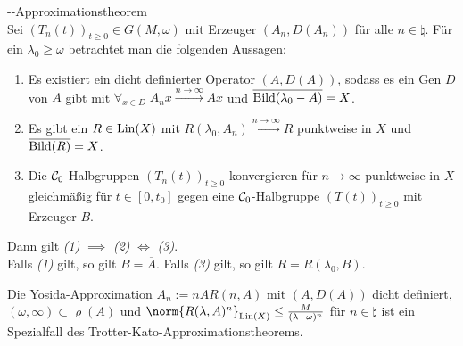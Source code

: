 \begin{Satz}{--Approximationstheorem}\\
    Sei $(T_n(t))_{t \ge 0} \in G(M, \omega)$ mit Erzeuger $(A_n, D(A_n))$ für alle
    $n \in \natural$.
    Für ein $\lambda_0 \ge \omega$ betrachtet man die folgenden Aussagen:
    \begin{enumerate}
        \item
        Es existiert ein dicht definierter Operator $(A, D(A))$, sodass es ein Gen $D$
        von $A$ gibt mit $\forall_{x \in D}\; A_n x \xrightarrow{n \to \infty} Ax$ und
        $\overline{\text{Bild}(\lambda_0 - A)} = X$.
        
        \item
        Es gibt ein $R \in \operatorname{Lin}(X)$ mit $R(\lambda_0, A_n) \xrightarrow{n \to \infty} R$
        punktweise in $X$ und $\overline{\text{Bild}(R)} = X$.
        
        \item
        Die $\mathcal{C}_0$-Halbgruppen $(T_n(t))_{t \ge 0}$ konvergieren für $n \to \infty$ punktweise
        in $X$ gleichmäßig für $t \in [0, t_0]$ gegen eine $\mathcal{C}_0$-Halbgruppe $(T(t))_{t \ge 0}$
        mit Erzeuger $B$.
    \end{enumerate}
    Dann gilt \emph{(1)} $\implies$ \emph{(2)} $\iff$ \emph{(3)}.\\
    Falls \emph{(1)} gilt, so gilt $B = \overline{A}$.
    Falls \emph{(3)} gilt, so gilt $R = R(\lambda_0, B)$.
\end{Satz}

\begin{Bsp}
    Die Yosida-Approximation $A_n := nA R(n, A)$ mit
    $(A, D(A))$ dicht definiert,\\
    $(\omega, \infty) \subset \varrho(A)$ und
    $\norm{R(\lambda, A)^n}_{\Lin(X)} \le \frac{M}{(\lambda - \omega)^n}$ für $n \in \natural$
    ist ein Spezialfall des Trotter-Kato-Approximationstheorems.
\end{Bsp}

\linie

